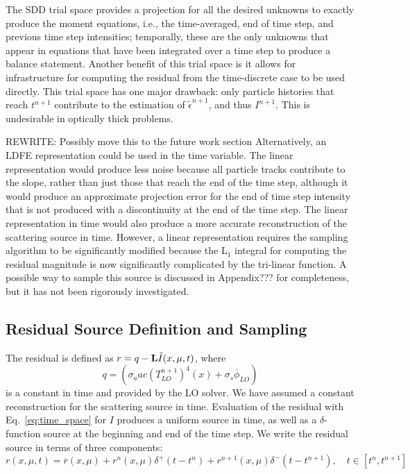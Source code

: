 The SDD trial space provides a projection for all the desired unknowns to exactly produce the moment
equations, i.e., the time-averaged, end of time step, and previous time step intensities;
temporally, these are the only unknowns that appear in equations that have
been integrated over a time step to produce a balance statement.  Another benefit of this
trial space is it allows for infrastructure for computing the residual from the
time-discrete case to be used directly.  This trial space has one major drawback:
only particle histories that reach $t^{n+1}$ contribute to the estimation of $\tilde
\epsilon^{n+1}$, and thus $I^{n+1}$.  This is undesirable in optically thick problems.

REWRITE: Possibly move this to the future work section
Alternatively, an LDFE representation could be used in the time
variable. The linear representation would produce less noise because all particle tracks
contribute to the slope, rather than just those that reach the end of the time step,
although it would produce an approximate projection error for the end of time step
intensity that is not produced with a discontinuity at the end of the time step.  The
linear representation in time would also produce a more accurate reconstruction of the
scattering source in time.  However, a linear representation requires the sampling
algorithm to be significantly modified because the L$_1$ integral for computing the
residual magnitude is now significantly complicated by the tri-linear function.  A
possible way to sample this source is discussed in Appendix??? for completeness, but it has
not been rigorously investigated.

\subsection{Residual Source Definition and Sampling}
\label{sec:time_sampling}

The residual is defined as $r = q - \mathbf{L} \tilde I(x,\mu,t)$, where
\begin{equation}
    q=\left(\sigma_a a c (T_{LO}^{n+1})^4(x) + \sigma_s\overline\phi_{LO}\right)
\end{equation}
is a constant in time and provided by the LO solver. We have assumed a constant reconstruction for the scattering source
in time.
Evaluation of the residual with Eq.~\eqref{eq:time_space} for $I$ produces a uniform source in time, as well as a $\delta$-function source at the
beginning and end of the time step.  We write the residual source in terms of three components:
\begin{equation}
    r(x,\mu,t) = \overline r(x,\mu)  + r^{n}(x,\mu)\delta^+(t-t^{n}) +
    r^{n+1}(x,\mu)\delta^-(t - t^{n+1}),
    \quad t\in[t^{n},t^{n+1}]
\end{equation}

